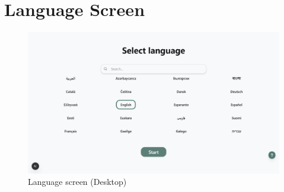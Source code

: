 \section{Language Screen}
\begin{figure}[H]
    \centering
    \includegraphics[height=0.3\textheight,keepaspectratio]{images/Screenshots/1_language_desktop.png}
    \caption{Language screen (Desktop)}
\end{figure}

